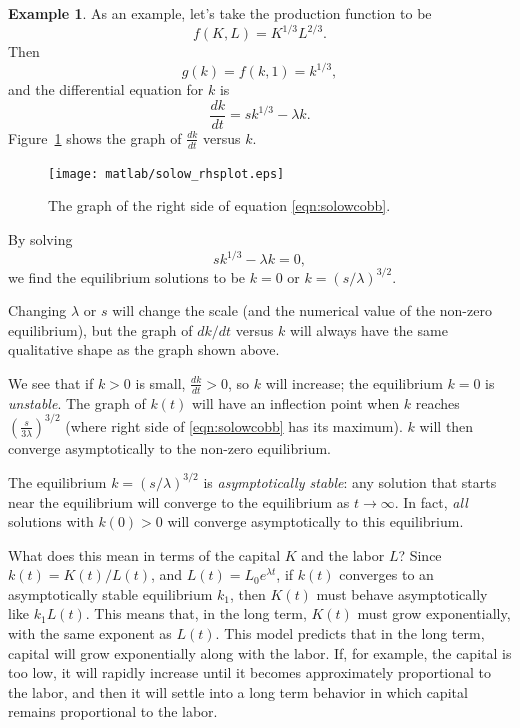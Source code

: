 \documentclass[reqno]{immbook}
\numberwithin{equation}{chapter}
\numberwithin{question}{section}
\numberwithin{theorem}{chapter}
\numberwithin{figure}{chapter}
\theoremstyle{definition}
\newtheorem{example}{Example}[section]
\begin{document}
\medskip
\begin{example}
\label{exm:solow}
As an example, let's take the production function to be
\begin{equation}
   f(K,L) = K^{1/3}L^{2/3}.
\label{eqn:cobbexample}
\end{equation}
Then
\begin{equation}
g(k) = f(k,1) = k^{1/3},
\end{equation}
 and the differential equation for
$k$ is
\begin{equation}
   \frac{dk}{dt} = sk^{1/3} - \lambda k .
\label{eqn:solowcobb}
\end{equation}
Figure~\ref{fig:solow_rhsplot} shows the graph of
$\frac{dk}{dt}$ versus $k$.
\begin{figure}
\centerline{\texttt{[image: matlab/solow\_rhsplot.eps]}}
\caption{The graph of the right side of equation \eqref{eqn:solowcobb}.}
\label{fig:solow_rhsplot}
\end{figure}

By solving
\[
   sk^{1/3} - \lambda k = 0,
\]
we find the equilibrium solutions to be $k=0$ or $k=(s/\lambda)^{3/2}$.


Changing $\lambda$ or $s$ will change the scale
(and the numerical value of the non-zero equilibrium),
but the graph of $dk/dt$ versus $k$ will always have the
same qualitative shape as the graph shown above.

We see that if $k>0$ is small,
$\frac{dk}{dt} > 0$, so $k$
will increase; the equilibrium $k=0$ is \emph{unstable}.
The graph of $k(t)$ will have an inflection point when $k$ reaches
$\left(\frac{s}{3\lambda}\right)^{3/2}$
(where right side of \eqref{eqn:solowcobb} has its maximum).
$k$ will then converge asymptotically to the non-zero equilibrium.

The equilibrium $k=(s/\lambda)^{3/2}$ is \emph{asymptotically stable}:
any solution that starts near the equilibrium will converge to the equilibrium
as $t\rightarrow \infty$.
In fact, \emph{all} solutions with $k(0)>0$ will converge asymptotically to this
equilibrium.

What does this mean in terms of the capital $K$ and the labor $L$?
Since $k(t) = K(t)/L(t)$, and $L(t) = L_0e^{\lambda t}$, if $k(t)$ converges to an
asymptotically stable equilibrium $k_1$, then $K(t)$ must behave asymptotically like
$k_1  L(t)$.  This means that, in the long term, $K(t)$ must 
grow exponentially, with the
same exponent as $L(t)$.
This model predicts that in the long term, capital will grow
exponentially along with the labor.
If, for example, the capital is too low, it will rapidly increase until it becomes
approximately proportional to the labor, and then it will settle into a long term behavior in
which capital remains proportional to the labor.
\end{example}
\end{document}
